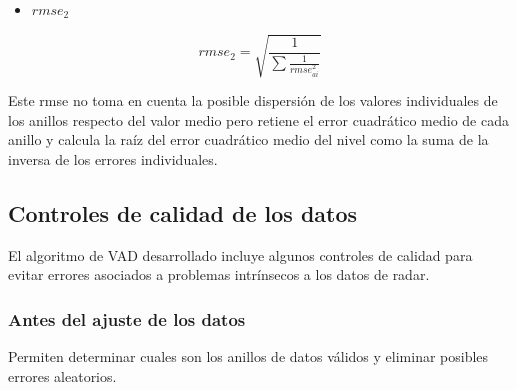 \documentclass[12pt,spanish,oneside]{book}
\providecommand{\tightlist}{%
  \setlength{\itemsep}{0pt}\setlength{\parskip}{0pt}}
\begin{document}
\begin{itemize}
\tightlist
\item
  \textbf{\(rmse_2\)}
\end{itemize}

\begin{equation}\label{eq-vr11}
rmse_2 = \sqrt{\frac{1}{\sum \frac{1}{rmse_{ai}^2}}}
\end{equation}

Este rmse no toma en cuenta la posible dispersión de los valores
individuales de los anillos respecto del valor medio pero retiene el
error cuadrático medio de cada anillo y calcula la raíz del error
cuadrático medio del nivel como la suma de la inversa de los errores
individuales.

\subsection{Controles de calidad de los
datos}\label{controles-de-calidad-de-los-datos}

El algoritmo de VAD desarrollado incluye algunos controles de calidad
para evitar errores asociados a problemas intrínsecos a los datos de
radar.

\subsubsection{Antes del ajuste de los
datos}\label{antes-del-ajuste-de-los-datos}

Permiten determinar cuales son los anillos de datos válidos y eliminar
posibles errores aleatorios.
\end{document}
